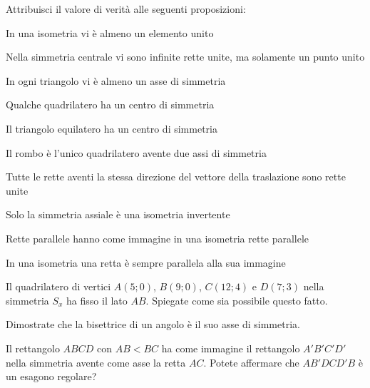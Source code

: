 \begin{esercizio}
\label{ese:8.90} %
Attribuisci il valore di verità alle seguenti proposizioni:
\begin{enumeratea}
\item In una isometria vi è almeno un elemento 
unito\hfill\boxV\quad\boxF
\item Nella simmetria centrale vi sono infinite rette unite, ma 
solamente un punto unito\tab\tab\hfill\boxV\quad\boxF
\item In ogni triangolo vi è almeno un asse di 
simmetria\hfill\boxV\quad\boxF
\item Qualche quadrilatero ha un centro di 
simmetria\hfill\boxV\quad\boxF
\item Il triangolo equilatero ha un centro di 
simmetria\hfill\boxV\quad\boxF
\item Il rombo è l'unico quadrilatero avente due assi di 
simmetria\hfill\boxV\quad\boxF
\item Tutte le rette aventi la stessa direzione del vettore della 
traslazione sono rette unite\tab\tab\hfill\boxV\quad\boxF
\item Solo la simmetria assiale è una isometria 
invertente\hfill\boxV\quad\boxF
\item Rette parallele hanno come immagine in una isometria rette 
parallele\hfill\boxV\quad\boxF
\item In una isometria una retta è sempre parallela alla sua 
immagine\hfill\boxV\quad\boxF
\end{enumeratea}
\end{esercizio}

\begin{esercizio}
\label{ese:8.91} %
Il quadrilatero di vertici $A(5;0)$, $B(9;0)$, $C(12;4)$ e $D(7;3)$ 
nella simmetria $S_x$ ha fisso il lato $AB$. Spiegate come sia 
possibile questo fatto.
\end{esercizio}

\begin{esercizio}
\label{ese:8.92} %
Dimostrate che la bisettrice di un angolo è il suo asse di simmetria.
\end{esercizio}

\begin{esercizio}
\label{ese:8.93} %
Il rettangolo $ABCD$ con $AB<BC$ ha come immagine il rettangolo 
$A'B'C'D'$ nella simmetria avente come asse la retta $AC$. Potete 
affermare che $AB'DCD'B$ è un esagono regolare?
\end{esercizio}

